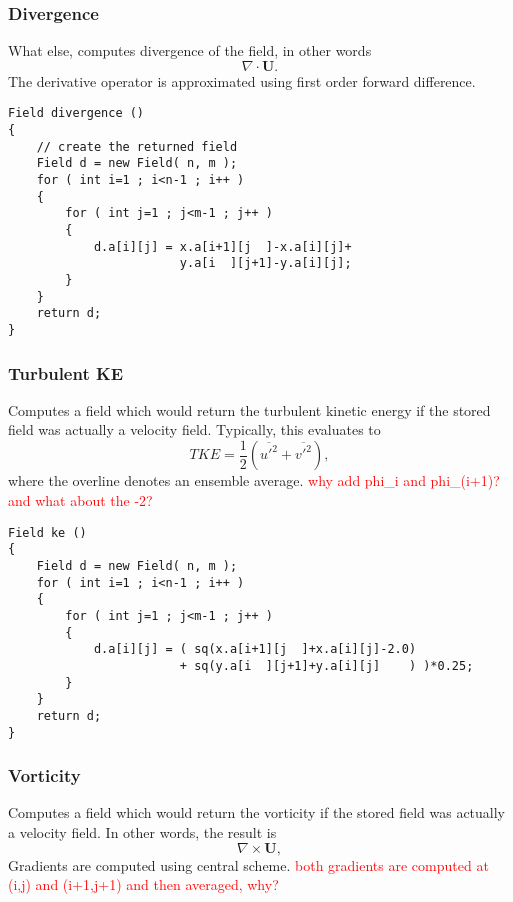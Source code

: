 \documentclass[notitlepage]{article}
\begin{document}
\subsubsection{Divergence}

What else, computes divergence of the field, in other words
%
\begin{equation}
\nabla \cdot \mathbf{U} .
\end{equation}
%
The derivative operator is approximated using first order forward difference.

\begin{lstlisting}[style=myCpp]
Field divergence ()
{
	// create the returned field
	Field d = new Field( n, m );
	for ( int i=1 ; i<n-1 ; i++ )
	{
		for ( int j=1 ; j<m-1 ; j++ )
		{
			d.a[i][j] = x.a[i+1][j  ]-x.a[i][j]+
						y.a[i  ][j+1]-y.a[i][j];
		}
	}
	return d;
}
\end{lstlisting}

\subsubsection{Turbulent KE}

Computes a field which would return the turbulent kinetic energy if the stored
field was actually a velocity field. Typically, this evaluates to
%
\begin{equation}
TKE = \frac{1}{2} \left( \overline{u'^2} + \overline{v'^2} \right),
\end{equation}
%
where the overline denotes an ensemble average.
\textcolor{red}{why add phi\_i and phi\_(i+1)? and what about the -2?}

\begin{lstlisting}[style=myCpp]
Field ke ()
{
	Field d = new Field( n, m );
	for ( int i=1 ; i<n-1 ; i++ )
	{
		for ( int j=1 ; j<m-1 ; j++ )
		{
			d.a[i][j] = ( sq(x.a[i+1][j  ]+x.a[i][j]-2.0)
				 		+ sq(y.a[i  ][j+1]+y.a[i][j]    ) )*0.25;
		}
	}
	return d;
}
\end{lstlisting}

\subsubsection{Vorticity}

Computes a field which would return the vorticity if the stored
field was actually a velocity field. In other words, the result is
%
\begin{equation}
\nabla \times \mathbf{U},
\end{equation}
%
Gradients are computed using central scheme.
\textcolor{red}{both gradients are computed at (i,j) and (i+1,j+1) and
then averaged, why?}
\end{document}

